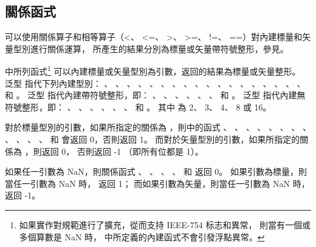 \subsection{關係函式}

可以使用關係算子和相等算子（<、 <=、 >、 >=、 !=、 ==）對內建標量和矢量型別進行關係運算，
所產生的結果分別為標量或矢量帶符號整形，參見。

中所列函式\footnote{
如果實作對規範進行了擴充，從而支持 IEEE-754 标志和異常，
則當有一個或多個算數是 NaN 時，
中所定義的內建函式不會引發{}浮點異常。}
可以內建標量或矢量型別為引數，返回的結果為標量或矢量整形。
泛型  指代下列內建型別：
 、 、 、 、
 、 、 、 、
 、 、 、 、
 、 、 、 、
 、 、  和 。
泛型  指代內建帶符號整形，即：
 、 、 、 、
 、 、  和 。
泛型  指代內建無符號整形，即：
 、 、 、 、
 、 、  和 。
其中  為 2、 3、 4、 8 或 16。

對於標量型別的引數，如果所指定的關係為 {}，則中的函式
 、 、 、 、
 、 、 、 、
 、 、 、 、
  和  會返回 0，否則返回 1。
而對於矢量型別的引數，如果所指定的關係為 {}，則返回 0，
否則返回 -1 （即所有位都是 1）。

如果任一引數為 NaN，則關係函式
 、 、 、
 、  和 
返回 0。
如果引數為標量，則當任一引數為 NaN 時，  返回 1；
而如果引數為矢量，則當任一引數為 NaN 時，  返回 -1。

{}

